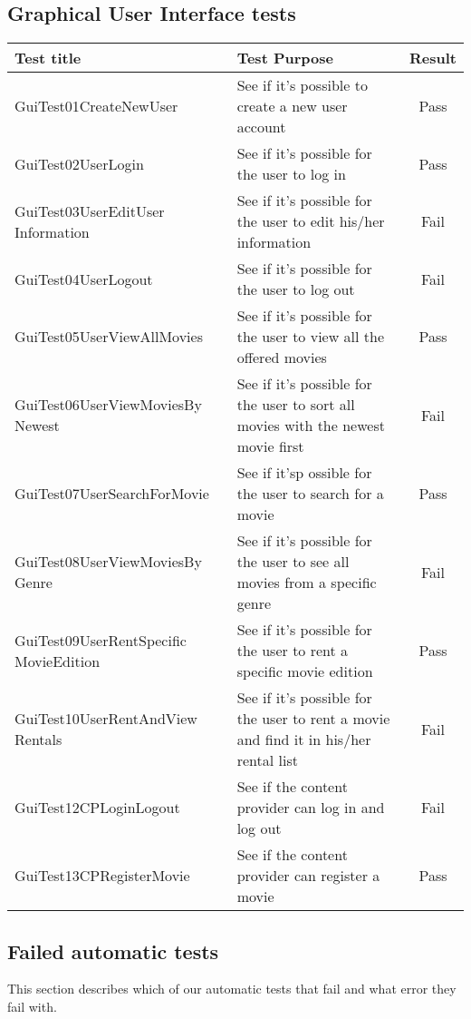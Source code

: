 \subsection{Graphical User Interface tests}
\label{Appendix_Test_Table_GUI}
\begin{centering}
\begin{longtable}{| p{5 cm} | p{9 cm} | c |}
\hline
Test title & Test Purpose & Result\\
\hline
GuiTest01CreateNewUser & See if it's possible to create a new user account & Pass\\
\hline
GuiTest02UserLogin & See if it's possible for the user to log in & Pass\\
\hline
GuiTest03UserEditUser Information & See if it's possible for the user to edit his/her information & Fail\\
\hline
GuiTest04UserLogout & See if it's possible for the user to log out & Fail\\
\hline
GuiTest05UserViewAllMovies & See if it's possible for the user to view all the offered movies & Pass\\
\hline
GuiTest06UserViewMoviesBy Newest & See if it's possible for the user to sort all movies with the newest movie first & Fail\\
\hline
GuiTest07UserSearchForMovie & See if it'sp ossible for the user to search for a movie & Pass\\
\hline
GuiTest08UserViewMoviesBy Genre & See if it's possible for the user to see all movies from a specific genre & Fail\\
\hline
GuiTest09UserRentSpecific MovieEdition & See if it's possible for the user to rent a specific movie edition & Pass\\
\hline
GuiTest10UserRentAndView Rentals & See if it's possible for the user to rent a movie and find it in his/her rental list & Fail\\
\hline
GuiTest12CPLoginLogout & See if the content provider can log in and log out & Fail\\
\hline
GuiTest13CPRegisterMovie & See if the content provider can register a movie & Pass\\
\hline
\end{longtable}
\end{centering}

\subsection{Failed automatic tests}
\label{Appendix_Test_Table_FailedTests}
This section describes which of our automatic tests that fail and what error they fail with.

